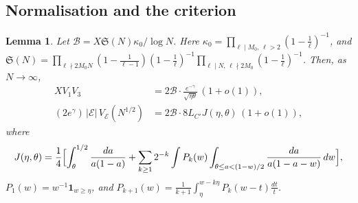 \documentclass[11pt]{amsart}
\newtheorem{lemma}[theorem]{Lemma}
\theoremstyle{remark}
\newcommand{\cE}{\mathcal E}
\newcommand{\sS}{\mathfrak S}
\begin{document}
\subsection{Normalisation and the criterion}
\begin{lemma}\label{lem:norm}
Let $\mathcal B=X\sS(N)\kappa_0/\log N$. Here $\kappa_0=\prod_{\ell\mid M_0,\,\ell>2}(1-\frac1\ell)^{-1}$, and $\sS(N)=\prod_{\ell\nmid2M_0N}(1-\frac1{\ell-1})(1-\frac1\ell)^{-1}\prod_{\ell\mid N,\,\ell\nmid 2M_0}(1-\frac1\ell)^{-1}$. Then, as $N\to\infty$,
\begin{align*}
XV_1V_3&=2\mathcal B\cdot\frac{e^{-\gamma}}{\sqrt{\eta\theta}}\,(1+o(1)),\\
(2e^\gamma)\,|\cE|\,V_{\cE}(N^{1/2})&=2\mathcal B\cdot8L_{C'}J(\eta,\theta)\,(1+o(1)),
\end{align*}
where
\[
J(\eta,\theta)=\frac14\Bigl[\int_\theta^{1/2}\frac{da}{a(1-a)}+\sum_{k\ge1}2^{-k}\int P_k(w)\int_{\theta\le a<(1-w)/2}\frac{da}{a(1-a-w)}\,dw\Bigr],
\]
$P_1(w)=w^{-1}\mathbf 1_{w\ge\eta}$, and $P_{k+1}(w)=\frac1{k+1}\int_\eta^{w-k\eta}P_k(w-t)\frac{dt}t$.
\end{lemma}
\end{document}
